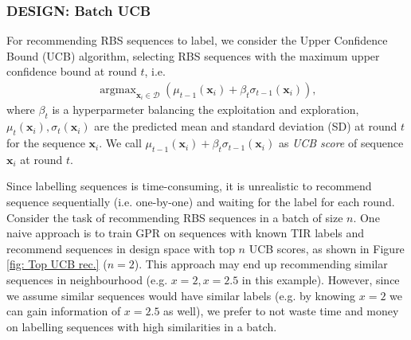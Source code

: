     

\subsubsection{DESIGN: Batch UCB}

For recommending RBS sequences to label, we consider the Upper Confidence Bound (UCB) algorithm, 
selecting RBS sequences with the maximum upper confidence bound at round $t$, i.e.
\begin{align}
\label{Eq: GPUCB}
    \operatorname{argmax}_{\mathbf{x}_i \in \mathcal{D}} \left( \mu_{t-1}(\mathbf{x}_i) + \beta_t \sigma_{t-1}(\mathbf{x}_i)\right),
\end{align}
where $\beta_t$ is a hyperparmeter balancing the exploitation and exploration, 
$\mu_t(\mathbf{x}_i), \sigma_t(\mathbf{x}_i)$ are the predicted mean and standard deviation (SD) at round $t$ for the sequence $\mathbf{x}_i$.
We call $\mu_{t-1}(\mathbf{x}_i) + \beta_t \sigma_{t-1}(\mathbf{x}_i)$ as \textit{UCB score} of sequence $\mathbf{x}_i$ at round $t$.

Since labelling sequences is time-consuming, it is unrealistic to recommend sequence sequentially (i.e. one-by-one) and waiting for the label for each round.
Consider the task of recommending RBS sequences in a batch of size $n$. 
One naive approach is to train GPR on sequences with known TIR labels and recommend sequences in design space with top $n$ UCB scores, as shown in Figure \ref{fig: Top UCB rec.} ($n = 2$).
This approach may end up recommending similar sequences in neighbourhood (e.g. $x = 2, x =2.5$ in this example). 
However, since we assume similar sequences would have similar labels (e.g. by knowing $x=2$ we can gain information of $x=2.5$ as well), we prefer to not waste time and money on labelling sequences with high similarities in a batch.

